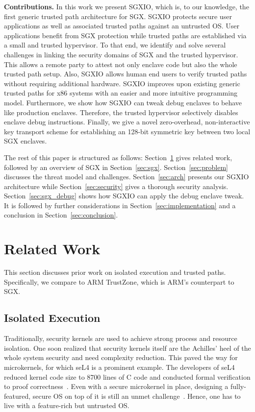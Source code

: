 \documentclass{sig-alternate-05-2015}
\begin{document}
\textbf{Contributions.}
In this work we present SGXIO, which is, to our knowledge, the first generic trusted path architecture for SGX.
SGXIO protects secure user applications as well as associated trusted paths against an untrusted OS. 
User applications benefit from SGX protection while trusted paths are established via a small and trusted hypervisor. 
To that end, we identify and solve several challenges in linking the security domains of SGX and the trusted hypervisor. 
This allows a remote party to attest not only enclave code but also the whole trusted path setup. 
Also, SGXIO allows human end users to verify trusted paths without requiring additional hardware.
SGXIO improves upon existing generic trusted paths for x86 systems with an easier and more intuitive programming model.
Furthermore, we show how SGXIO can tweak debug enclaves to behave like production enclaves. 
Therefore, the trusted hypervisor selectively disables enclave debug instructions. 
Finally, we give a novel zero-overhead, non-interactive key transport scheme for establishing an 128-bit symmetric key between two local SGX enclaves. 

The rest of this paper is structured as follows: Section~\ref{sec:related} gives related work, followed by an overview of SGX in Section~\ref{sec:sgx}. 
Section~\ref{sec:problem} discusses the threat model and challenges.
Section~\ref{sec:arch} presents our SGXIO architecture while Section~\ref{sec:security} gives a thorough security analysis. 
Section~\ref{sec:sgx_debug} shows how SGXIO can apply the debug enclave tweak. 
It is followed by further considerations in Section~\ref{sec:implementation} and a conclusion in Section~\ref{sec:conclusion}.


\section{Related Work}\label{sec:related}
This section discusses prior work on isolated execution and trusted paths. Specifically, we compare to ARM TrustZone, which is ARM's counterpart to SGX.

\subsection{Isolated Execution}

Traditionally, security kernels are used to achieve strong process and resource isolation. 
One soon realized that security kernels itself are the Achilles' heel of the whole system security and need complexity reduction. 
This paved the way for microkernels, for which seL4 is a prominent example. 
The developers of seL4 reduced kernel code size to 8700 lines of C code and conducted formal verification to proof correctness~\cite{sel4proof}. 
Even with a secure microkernel in place, designing a fully-featured, secure OS on top of it is still an unmet challenge~\cite{jacobsen_lightweight_2016}. 
Hence, one has to live with a feature-rich but untrusted OS. 
\end{document}
